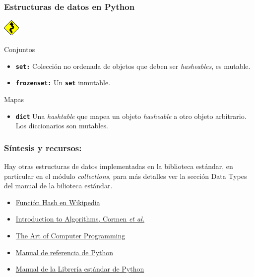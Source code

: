 \documentclass{beamer}
\begin{document}
\begin{frame}
\frametitle{Estructuras de datos en Python}
\includegraphics[height=0.8cm, width=0.8cm]{figuras/sin.png}
    \begin{block}{Conjuntos}
        \begin{itemize}
            \item {\tt \bf set:} Colección no ordenada de objetos que deben ser {\em hasheables}, es mutable.
            \item {\tt \bf frozenset:} Un {\tt \bf set} inmutable.
        \end{itemize}
    \end{block}
    \begin{block}{Mapas}
        \begin{itemize}
            \item {\tt \bf dict} Una {\em hashtable} que mapea un objeto {\em hasheable} a otro objeto arbitrario. Los diccionarios son mutables. 
        \end{itemize}
    \end{block}

\end{frame}

\begin{frame}
    \frametitle{Síntesis y recursos:}

    Hay otras estructuras de datos implementadas en la biblioteca estándar, en particular en el módulo {\em collections}, para más detalles ver la sección Data Types del manual de la bilioteca estándar.
    
    \begin{itemize}
    \item \href{https://bit.ly/3nRJIJD}{Función Hash en Wikipedia}
    \item \href{https://www.amazon.com/Introduction-Algorithms-3rd-MIT-Press/dp/0262033844?tag=guru990f-20}{Introduction to Algorithms, Cormen {\em et al.}}
    \item \href{https://en.wikipedia.org/wiki/The_Art_of_Computer_Programming}{The Art of Computer Programming}
    \item \href{https://docs.python.org/3/reference/index.html}{Manual de referencia de Python}
    \item \href{https://docs.python.org/3/library/index.html}{Manual de la Librería estándar de Python}
    \end{itemize}
    \end{frame}
\end{document}
